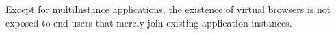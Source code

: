 Except for multiInstance applications, the existence of virtual browsers is not exposed to
end users that merely join existing application instances.




